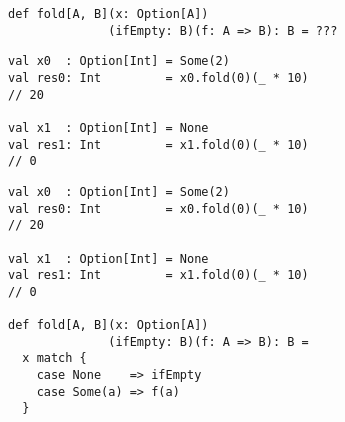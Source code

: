 \documentclass[include/preamble.tex]{subfiles}
\begin{document}
\begin{frame}[fragile]
  \begin{center}
  \end{center}
\end{frame}

\begin{frame}[fragile]
  \begin{center}
    \begin{lstlisting}[style=scala]
def fold[A, B](x: Option[A])
              (ifEmpty: B)(f: A => B): B = ???
    \end{lstlisting}
    \pause
    \vspace{1em}
    \begin{lstlisting}[style=scala]
val x0  : Option[Int] = Some(2)
val res0: Int         = x0.fold(0)(_ * 10)
// 20

val x1  : Option[Int] = None
val res1: Int         = x1.fold(0)(_ * 10)
// 0
    \end{lstlisting}
  \end{center}
\end{frame}

\begin{frame}[fragile]
  \begin{center}
    \begin{lstlisting}[style=scala]
val x0  : Option[Int] = Some(2)
val res0: Int         = x0.fold(0)(_ * 10)
// 20

val x1  : Option[Int] = None
val res1: Int         = x1.fold(0)(_ * 10)
// 0

def fold[A, B](x: Option[A])
              (ifEmpty: B)(f: A => B): B =
  x match {
    case None    => ifEmpty
    case Some(a) => f(a)
  }
    \end{lstlisting}
  \end{center}
\end{frame}
\end{document}
